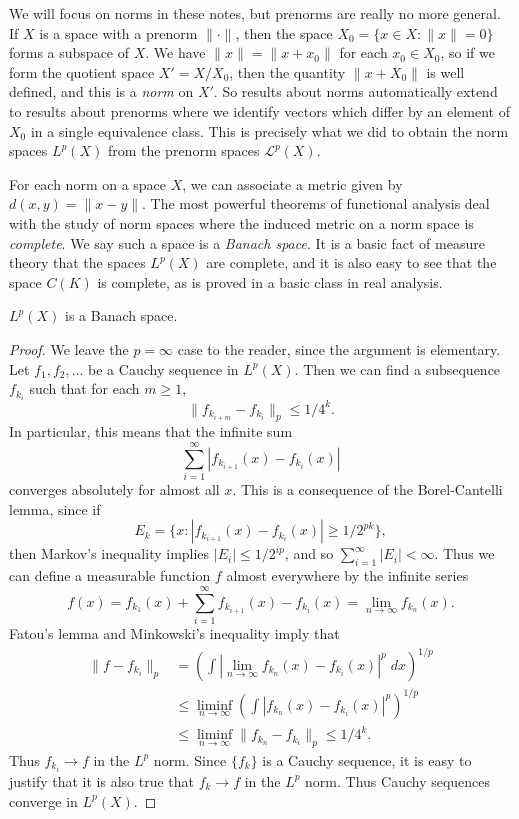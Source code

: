 \begin{remark}
    We will focus on norms in these notes, but prenorms are really no more general. If $X$ is a space with a prenorm $\| \cdot \|$, then the space $X_0 = \{ x \in X: \| x \| = 0 \}$ forms a subspace of $X$. We have $\| x \| = \| x + x_0 \|$ for each $x_0 \in X_0$, so if we form the quotient space $X' = X/X_0$, then the quantity $\| x + X_0 \|$ is well defined, and this is a {\it norm} on $X'$. So results about norms automatically extend to results about prenorms where we identify vectors which differ by an element of $X_0$ in a single equivalence class. This is precisely what we did to obtain the norm spaces $L^p(X)$ from the prenorm spaces $\mathcal{L}^p(X)$.
\end{remark}

For each norm on a space $X$, we can associate a metric given by $d(x,y) = \| x - y \|$. The most powerful theorems of functional analysis deal with the study of norm spaces where the induced metric on a norm space is {\it complete}. We say such a space is a {\it Banach space}. It is a basic fact of measure theory that the spaces $L^p(X)$ are complete, and it is also easy to see that the space $C(K)$ is complete, as is proved in a basic class in real analysis.

\begin{theorem}
    $L^p(X)$ is a Banach space.
\end{theorem}
\begin{proof}
    We leave the $p = \infty$ case to the reader, since the argument is elementary. Let $f_1, f_2, \dots$ be a Cauchy sequence in $L^p(X)$. Then we can find a subsequence $f_{k_i}$ such that for each $m \geq 1$,
    \[ \| f_{k_{i+m}} - f_{k_i} \|_p \leq 1/4^k. \]
    In particular, this means that the infinite sum
    \[ \sum_{i = 1}^\infty |f_{k_{i+1}}(x) - f_{k_i}(x)| \]
    converges absolutely for almost all $x$. This is a consequence of the Borel-Cantelli lemma, since if 
    \[ E_k = \{ x : |f_{k_{i+1}}(x) - f_{k_i}(x)| \geq 1/2^{pk} \}, \]
    then Markov's inequality implies $|E_i| \leq 1/2^{ip}$, and so $\sum_{i = 1}^\infty |E_i| < \infty$. Thus we can define a measurable function $f$ almost everywhere by the infinite series
    \[ f(x) = f_{k_1}(x) + \sum_{i = 1}^\infty f_{k_{i+1}}(x) - f_{k_i}(x) = \lim_{n \to \infty} f_{k_n}(x). \]
    Fatou's lemma and Minkowski's inequality imply that
    \begin{align*}
        \| f - f_{k_i} \|_p &= \left( \int \left| \lim_{n \to \infty} f_{k_n}(x) - f_{k_i}(x) \right|^p\; dx \right)^{1/p}\\
        &\leq \liminf_{n \to \infty} \left( \int \left| f_{k_n}(x) - f_{k_i}(x) \right|^p \right)^{1/p}\\
        &\leq \liminf_{n \to \infty} \| f_{k_n} - f_{k_i} \|_p \leq 1/4^k.
    \end{align*}
    Thus $f_{k_i} \to f$ in the $L^p$ norm. Since $\{ f_k \}$ is a Cauchy sequence, it is easy to justify that it is also true that $f_k \to f$ in the $L^p$ norm. Thus Cauchy sequences converge in $L^p(X)$.
\end{proof}

